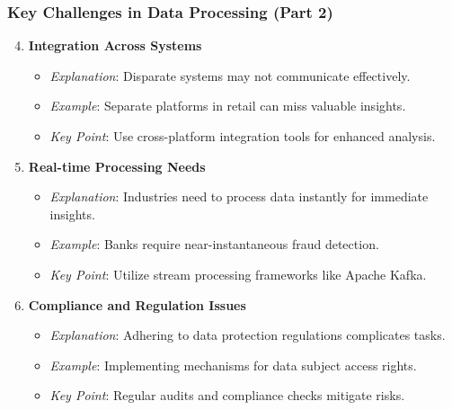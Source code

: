 \documentclass[aspectratio=169]{beamer}
\begin{document}
\begin{frame}[fragile]
    \frametitle{Key Challenges in Data Processing (Part 2)}
    \begin{enumerate}
        \setcounter{enumi}{3} %
        
        \item \textbf{Integration Across Systems}
        \begin{itemize}
            \item \textit{Explanation}: Disparate systems may not communicate effectively.
            \item \textit{Example}: Separate platforms in retail can miss valuable insights.
            \item \textit{Key Point}: Use cross-platform integration tools for enhanced analysis.
        \end{itemize}
        
        \item \textbf{Real-time Processing Needs}
        \begin{itemize}
            \item \textit{Explanation}: Industries need to process data instantly for immediate insights.
            \item \textit{Example}: Banks require near-instantaneous fraud detection.
            \item \textit{Key Point}: Utilize stream processing frameworks like Apache Kafka.
        \end{itemize}
        
        \item \textbf{Compliance and Regulation Issues}
        \begin{itemize}
            \item \textit{Explanation}: Adhering to data protection regulations complicates tasks.
            \item \textit{Example}: Implementing mechanisms for data subject access rights.
            \item \textit{Key Point}: Regular audits and compliance checks mitigate risks.
        \end{itemize}
    \end{enumerate}
\end{frame}
\end{document}
